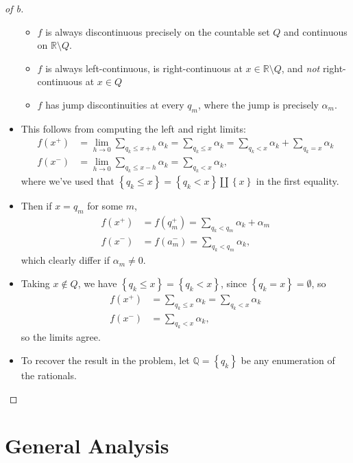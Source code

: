 \begin{solution}
\begin{proof}[of b]
\begin{itemize}
  \begin{itemize}
  \item
    \(f\) is always discontinuous precisely on the countable set \(Q\)
    and continuous on \({\mathbb{R}}\setminus Q\).
  \item
    \(f\) is always left-continuous, is right-continuous at
    \(x\in{\mathbb{R}}\setminus Q\), and \emph{not} right-continuous at
    \(x\in Q\)
  \item
    \(f\) has jump discontinuities at every \(q_m\), where the jump is
    precisely \(\alpha_m\).
  \end{itemize}
\item
  This follows from computing the left and right limits:
  \begin{align*}
  f(x^+) &= \lim_{h\to 0} \sum_{q_k \leq x+h} \alpha_k = \sum_{q_k\leq x} \alpha_k = \sum_{q_k < x} \alpha_k + \sum_{q_k = x} \alpha_k \\
  f(x^-) &= \lim_{h\to 0} \sum_{q_k \leq x-h} \alpha_k = \sum_{q_k < x} \alpha_k
  ,\end{align*}
  where we've used that
  \(\left\{{q_k \leq x}\right\} = \left\{{q_k < x}\right\} {\textstyle\coprod}\left\{{x}\right\}\)
  in the first equality.
\item
  Then if \(x=q_m\) for some \(m\),
  \begin{align*}
  f(x^+) &= f(q_m^+) = \sum_{q_k < q_m} \alpha_k + \alpha_m \\
  f(x^-) &= f(a_m^-) = \sum_{q_k< q_m} \alpha_k
  ,\end{align*}
  which clearly differ if \(\alpha_m \neq 0\).
\item
  Taking \(x\not\in Q\), we have
  \(\left\{{q_k \leq x}\right\} = \left\{{q_k < x}\right\}\), since
  \(\left\{{q_k=x}\right\} = \emptyset\), so
  \begin{align*}
  f(x^+) &= \sum_{q_k\leq x} \alpha_k = \sum_{q_k < x} \alpha_k \\
  f(x^-) &= \sum_{q_k< x} \alpha_k
  ,\end{align*}
  so the limits agree.
\item
  To recover the result in the problem, let
  \({\mathbb{Q}}= \left\{{q_k}\right\}\) be any enumeration of the
  rationals.
\end{itemize}

\end{proof}

\end{solution}

\hypertarget{general-analysis}{%
\section{General Analysis}\label{general-analysis}}

